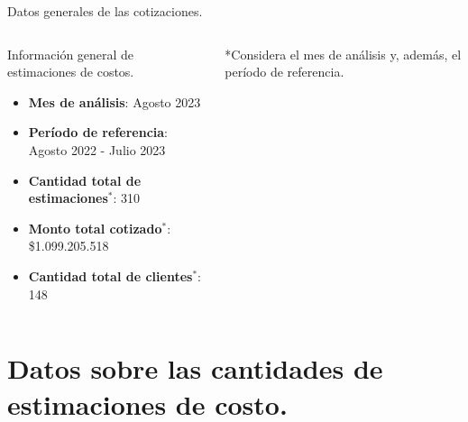 \documentclass[aspectratio=169,xcolor=dvipsnames]{beamer}
\begin{document}
\begin{frame}{Datos generales de las cotizaciones.}


\begin{columns}[c]
\begin{block}{Información general de estimaciones de costos.}
\begin{itemize}
    \item \textbf{Mes de análisis}: Agosto 2023
    \item \textbf{Período de referencia}: Agosto 2022 - Julio 2023 
    \item \textbf{Cantidad total de estimaciones$^{*}$}: 310
    \item \textbf{Monto total cotizado$^{*}$}: \$1.099.205.518
    \item \textbf{Cantidad total de clientes$^{*}$}: 148
\end{itemize}
\end{block}
\begin{block}{}
    \footnotesize{*Considera el mes de análisis y, además, el período de referencia.}
\end{block}
\end{columns}


\end{frame}



\section{Datos sobre las cantidades de estimaciones de costo.}
\end{document}
